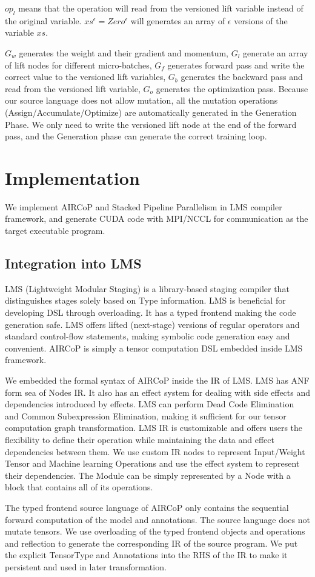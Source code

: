 \documentclass[sigplan, nonacm]{acmart}\settopmatter{printfolios=true,printccs=false,printacmref=false}
\begin{document}
$op_l$ means that the operation will read from the versioned lift variable instead of the original variable. $xs^\epsilon = Zero^\epsilon$ will generates an array of $\epsilon$ versions of the variable $xs$.\par
$G_w$ generates the weight and their gradient and momentum, $G_l$ generate an array of lift nodes for different micro-batches, $G_f$ generates forward pass and write the correct value to the versioned lift variables, $G_b$ generates the backward pass and read from the versioned lift variable, $G_o$ generates the optimization pass. Because our source language does not allow mutation, all the mutation operations (Assign/Accumulate/Optimize) are automatically generated in the Generation Phase. We only need to write the versioned lift node at the end of the forward pass, and the Generation phase can generate the correct training loop.
\section{Implementation} \label{implementation}
We implement AIRCoP and Stacked Pipeline Parallelism in LMS compiler framework\cite{rompf2010lightweight}, and generate CUDA\cite{sanders2010cuda} code with MPI\cite{gropp1999using}/NCCL for communication as the target executable program.\par
\subsection{Integration into LMS}
 LMS (Lightweight Modular Staging) is a library-based staging compiler that distinguishes stages solely based on Type information. LMS is beneficial for developing DSL through overloading. It has a typed frontend making the code generation safe. LMS offers lifted (next-stage) versions of regular operators and standard control-flow statements, making symbolic code generation easy and convenient. AIRCoP is simply a tensor computation DSL embedded inside LMS framework.\par
We embedded the formal syntax of AIRCoP inside the IR of LMS. LMS has ANF\cite{flanagan1993essence} form sea of Nodes\cite{click1995simple} IR. It also has an effect system for dealing with side effects and dependencies introduced by effects. LMS can perform Dead Code Elimination and Common Subexpression Elimination, making it sufficient for our tensor computation graph transformation. LMS IR is customizable and offers users the flexibility to define their operation while maintaining the data and effect dependencies between them. We use custom IR nodes to represent Input/Weight Tensor and Machine learning Operations and use the effect system to represent their dependencies. The Module can be simply represented by a Node with a block that contains all of its operations. \par
The typed frontend source language of AIRCoP only contains the sequential forward computation of the model and annotations. The source language does not mutate tensors. We use overloading of the typed frontend objects and operations and reflection to generate the corresponding IR of the source program. We put the explicit TensorType and Annotations into the RHS of the IR to make it persistent and used in later transformation. \par
\end{document}
